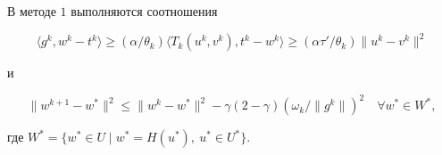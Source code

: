\begin{lem} \label{lm:4} 


В методе $1$ выполняются соотношения


\begin{equation} \label{eq:16} 


\langle g^{k}, w^{k} - t^{k} \rangle \geq 


(\alpha / \theta_{k}) \langle T_{k}(u^{k}, v^{k}), t^{k} - w^{k} \rangle 


\geq(\alpha \tau' / \theta_{k}) \| u^{k} - v^{k} \|^{2} 


\end{equation}


и 


\begin{equation} \label{eq:17} 


\| w^{k+1} - w^{*} \|^{2} 


\leq \| w^{k} - w^{*} \|^{2} - 


\gamma(2 - \gamma)(\omega_{k} / \| g^{k} \|)^{2}


\quad \forall w^{*} \in W^{*}, 


\end{equation}


где $W^{*}=\{ w^{*} \in U \mid w^{*}=H(u^{*}),\ u^{*} \in U^{*} \}$. 


\end{lem}





